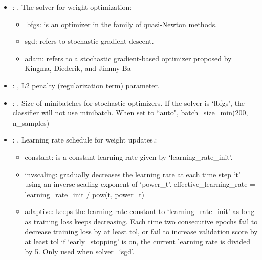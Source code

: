 \begin{itemize}
    \item {}: , 
      The solver for weight optimization:
      \begin{itemize}                                                   \item lbfgs: is an optimizer
      in the family of quasi-Newton methods.                                                   \item
      sgd: refers to stochastic gradient descent.
      \item adam: refers to a stochastic gradient-based optimizer proposed by Kingma, Diederik, and
      Jimmy Ba                                                  \end{itemize}

    \item {}: , 
      L2 penalty (regularization term) parameter.

    \item {}: , 
      Size of minibatches for stochastic optimizers. If the solver is `lbfgs',
      the classifier will not use minibatch. When set to ``auto", batch\_size=min(200, n\_samples)

    \item {}: , 
      Learning rate schedule for weight updates.:
      \begin{itemize}                                                   \item constant: is a
      constant learning rate given by `learning\_rate\_init'.
      \item invscaling: gradually decreases the learning rate at each time step `t' using
      an inverse scaling exponent of `power\_t'. effective\_learning\_rate = learning\_rate\_init /
      pow(t, power\_t)                                                   \item adaptive: keeps the
      learning rate constant to `learning\_rate\_init' as long as training
      loss keeps decreasing. Each time two consecutive epochs fail to decrease training loss by at
      least tol, or fail to increase validation score by at least tol if `early\_stopping' is on,
      the current learning rate is divided by 5. Only used when solver=`sgd'.
      \end{itemize}


\end{itemize}
